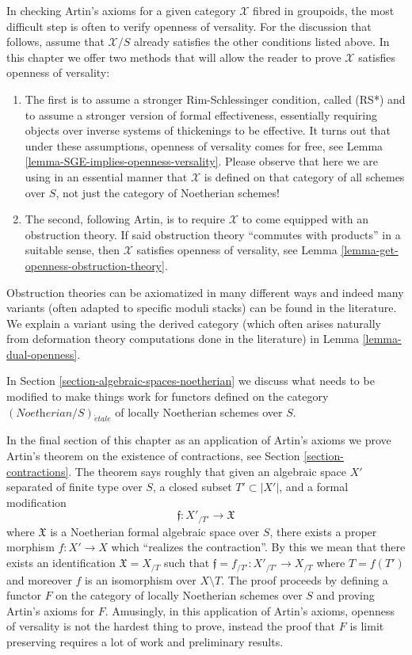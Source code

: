 \documentclass{stacks-project}
\theoremstyle{plain}
\theoremstyle{definition}
\theoremstyle{remark}
\numberwithin{equation}{subsection}
\def\etale{{\acute{e}tale}}
\begin{document}
\medskip\noindent
In checking Artin's axioms for a given category $\mathcal{X}$ fibred
in groupoids, the most difficult step is often to verify openness
of versality. For the discussion that follows, assume that $\mathcal{X}/S$
already satisfies the other conditions listed above.
In this chapter we offer two methods that will allow the reader
to prove $\mathcal{X}$ satisfies openness of versality:
\begin{enumerate}
\item The first is to assume a stronger Rim-Schlessinger
condition, called (RS*) and to assume a stronger version of
formal effectiveness, essentially requiring objects over
inverse systems of thickenings to be effective. It turns out
that under these assumptions, openness of versality comes for
free, see Lemma \ref{lemma-SGE-implies-openness-versality}.
Please observe that here we are using in an essential manner
that $\mathcal{X}$ is defined on that category of all schemes
over $S$, not just the category of Noetherian schemes!
\item The second, following Artin, is to require $\mathcal{X}$
to come equipped with an obstruction theory. If said obstruction
theory ``commutes with products'' in a suitable sense, then
$\mathcal{X}$ satisfies openness of versality, see
Lemma \ref{lemma-get-openness-obstruction-theory}.
\end{enumerate}
Obstruction theories can be axiomatized in many different ways
and indeed many variants (often adapted to specific moduli stacks)
can be found in the literature. We explain a variant using the derived category
(which often arises naturally from deformation theory computations
done in the literature) in Lemma \ref{lemma-dual-openness}.

\medskip\noindent
In Section \ref{section-algebraic-spaces-noetherian}
we discuss what needs to be modified to make
things work for functors defined on the category
$(\textit{Noetherian}/S)_\etale$ of locally Noetherian
schemes over $S$.

\medskip\noindent
In the final section of this chapter as an application of Artin's axioms
we prove Artin's theorem on the existence of contractions, see
Section \ref{section-contractions}. The theorem says roughly that given an
algebraic space $X'$ separated of finite type over $S$,
a closed subset $T' \subset |X'|$, and a formal modification
$$
\mathfrak{f} : X'_{/T'} \longrightarrow \mathfrak{X}
$$
where $\mathfrak{X}$ is a Noetherian formal algebraic space over $S$,
there exists a proper morphism $f : X' \to X$ which
``realizes the contraction''. By this we mean that there exists an
identification $\mathfrak{X} = X_{/T}$ such that
$\mathfrak{f} = f_{/T'} : X'_{/T'} \to X_{/T}$ where $T = f(T')$
and moreover $f$ is an isomorphism over $X \setminus T$. The proof proceeds
by defining a functor $F$ on the category of locally Noetherian schemes
over $S$ and proving Artin's axioms for $F$. Amusingly, in this
application of Artin's axioms, openness of versality is not the hardest
thing to prove, instead the proof that $F$ is limit preserving requires
a lot of work and preliminary results.
\end{document}
